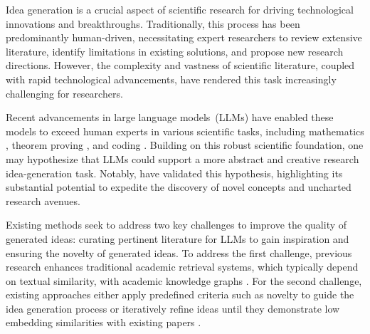 \documentclass{article}
\newcommand{\orange}[1]{\textcolor{orange}{#1}}
\begin{document}
Idea generation is a crucial aspect of scientific research for driving technological innovations and breakthroughs. Traditionally, this process has been predominantly human-driven, necessitating expert researchers to review extensive literature, identify limitations in existing solutions, and propose new research directions. However, the complexity and vastness of scientific literature, coupled with rapid technological advancements, have rendered this task increasingly challenging for researchers.


Recent advancements in large language models~(LLMs) \citep{achiam2023gpt4,dubey2024llama3,yang2024qwen2} have enabled these models to exceed human experts in various scientific tasks, including mathematics \citep{yu2023metamath}, theorem proving \citep{yang2023leandojo}, and coding \citep{chen2021evaluating}. Building on this robust scientific foundation, one may hypothesize that LLMs could support a more abstract and creative research idea-generation task. Notably, \cite{si2024stanfordcan, kumar2024can} have validated this hypothesis, highlighting its substantial potential to expedite the discovery of novel concepts and uncharted research avenues.



Existing methods seek to address two key challenges to improve the quality of generated ideas: curating pertinent literature for LLMs to gain inspiration and ensuring the novelty of generated ideas. To address the first challenge, previous research enhances traditional academic retrieval systems, which typically depend on textual similarity, with academic knowledge graphs \citep{baek2024researchagent,wang2023scimon}. 
For the second challenge, existing approaches either apply predefined criteria such as novelty to guide the idea generation process \citep{baek2024researchagent} or iteratively refine ideas until they demonstrate low embedding similarities with existing papers \citep{wang2023scimon}.
\end{document}
